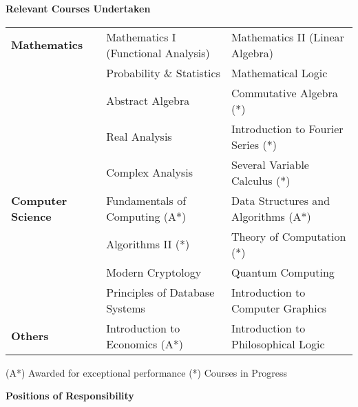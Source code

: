 \documentclass[letterpaper,11pt]{article}
\begin{document}
{\begin{itemize}
\end{itemize}

\Large{\textbf{Relevant Courses Undertaken}}
\small

\begin{tabular}{p{4cm} p{7cm} p{7cm}}
\\
\textbf{ Mathematics} & Mathematics I (Functional Analysis) & Mathematics II (Linear Algebra) \vspace{4pt}\\
& Probability \& Statistics & Mathematical Logic\vspace{4pt}\\
& Abstract Algebra & Commutative Algebra (*)\vspace{4pt}\\
& Real Analysis & Introduction to Fourier Series (*)\vspace{4pt}\\
& Complex Analysis & Several Variable Calculus (*)\vspace{9pt}\\

\textbf{ Computer Science} & Fundamentals of Computing (A*) & Data Structures and Algorithms (A*)\vspace{4pt}\\
& Algorithms II (*) & Theory of Computation (*)\vspace{4pt}\\
& Modern Cryptology & Quantum Computing\vspace{4pt}\\
& Principles of Database Systems & Introduction to Computer Graphics\vspace{9pt}\\

\textbf{ Others} & Introduction to Economics (A*) & Introduction to Philosophical Logic\vspace{9pt}\\
\end{tabular}

\footnotesize{\hspace*{0.5in}(A*) Awarded for exceptional performance
\hspace{1.5in}  (*) Courses in Progress\\

\vspace{10pt}

\Large{\textbf{Positions of Responsibility}}
\small

}}
\end{document}

